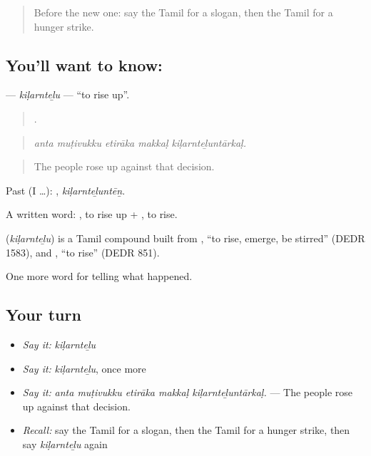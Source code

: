 \label{lesson:TA-C311-kilarntelu}



\begin{quote}
Before the new one: say the Tamil for a slogan, then the Tamil for a hunger strike.
\end{quote}

\subsection*{You'll want to know: }
\textbf{} — \emph{kiḷarnteḻu} — \textquotedblleft{}to rise up\textquotedblright{}.

\begin{quote}
    .
\end{quote}

\begin{quote}
\emph{anta muṭivukku etirāka makkaḷ kiḷarnteḻuntārkaḷ.}
\end{quote}

\begin{quote}
The people rose up against that decision.
\end{quote}

Past (I …): , \emph{kiḷarnteḻuntēṉ}.

A written word: , to rise up + , to rise.

\begin{cousinweb}
\textbf{} (\emph{kiḷarnteḻu}) is a Tamil compound built from , \textquotedblleft{}to rise, emerge, be stirred\textquotedblright{} (DEDR 1583), and , \textquotedblleft{}to rise\textquotedblright{} (DEDR 851).
\end{cousinweb}

\begin{grammarlens}[title={What you've built}]
One more word for telling what happened.
\end{grammarlens}

\subsection*{Your turn}
\begin{itemize}
\raggedright
  \item \emph{Say it:} \emph{kiḷarnteḻu}
  \item \emph{Say it:} \emph{kiḷarnteḻu}, once more
  \item \emph{Say it:} \emph{anta muṭivukku etirāka makkaḷ kiḷarnteḻuntārkaḷ.} — The people rose up against that decision.
  \item \emph{Recall:} say the Tamil for a slogan, then the Tamil for a hunger strike, then say \emph{kiḷarnteḻu} again
\end{itemize}


